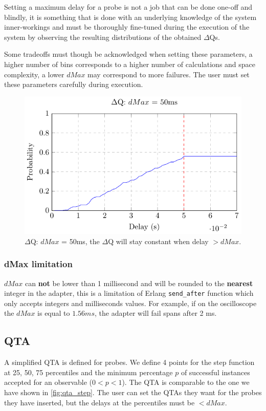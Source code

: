     Setting a maximum delay for a probe is not a job that can be done one-off and blindly, it is something that is done with an underlying knowledge of the system inner-workings and must be thoroughly fine-tuned during the execution of the system by observing the resulting distributions of the obtained $\Delta$Qs. \label{subsec:dMax}

    Some tradeoffs must though be acknowledged when setting these parameters, a higher number of bins corresponds to a higher number of calculations and space complexity, a lower $dMax$ may correspond to more failures. The user must set these parameters carefully during execution.

    \begin{figure}[H]
        \begin{center}
            \includegraphics[scale = 1]{tikz/cdf_dmax.pdf}
        \end{center}
        \caption{$\Delta$Q: $dMax$ = 50ms, the $\Delta$Q will stay constant when delay $> dMax$.}
    \end{figure}

    \subsubsection{dMax limitation}
        $dMax$ can \textbf{not} be lower than 1 millisecond and will be rounded to the \textbf{nearest} integer in the adapter, this is a limitation of Erlang \texttt{send\_after} function which only accepts integers and milliseconds values. For example, if on the oscilloscope the $dMax$ is equal to $1.56 ms$, the adapter will fail spans after 2 ms.

    \subsection{QTA}
        A simplified QTA is defined for probes. We define 4 points for the step function at 25, 50, 75 percentiles and the minimum percentage $p$ of successful instances accepted for an observable ($0 < p < 1$). The QTA is comparable to the one we have shown in \cref{fig:qta_step}. The user can set the QTAs they want for the probes they have inserted, but the delays at the percentiles must be $< dMax$. \label{subsec:qta_i}

